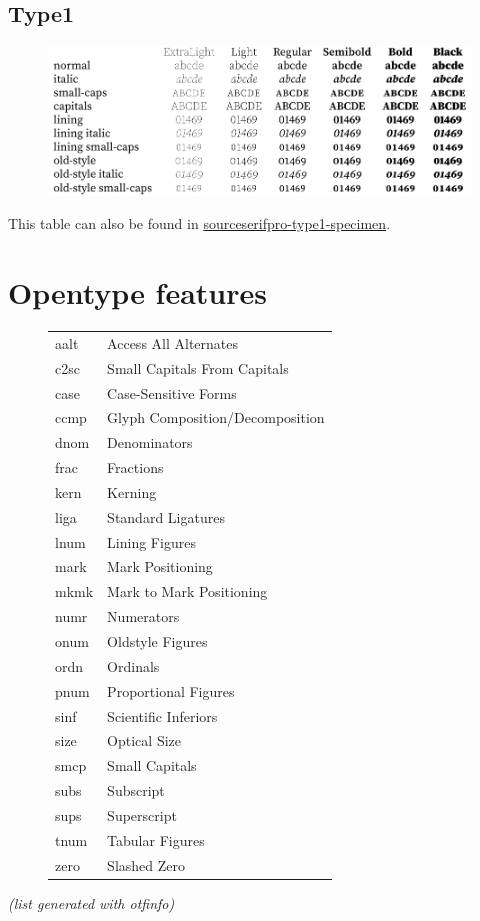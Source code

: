 \documentclass[10pt,a4paper,english]{article}
\newcommand*\file[1]{\href{run:#1.pdf}{#1}}
\begin{document}
\subsection{Type1}
\begin{figure}[ht]
	\centering
	\includegraphics{sourceserifpro-type1-specimen}
\end{figure}
This table can also be found in \file{sourceserifpro-type1-specimen}.

\newpage
\section{Opentype features}
\label{sec:otfinfo}

\begin{figure}[ht]
	\centering
	\begin{tabular}{>{\ttfamily}l l}
		aalt & Access All Alternates \\
		c2sc & Small Capitals From Capitals \\
		case & Case-Sensitive Forms \\
		ccmp & Glyph Composition/Decomposition \\
		dnom & Denominators \\
		frac & Fractions \\
		kern & Kerning \\
		liga & Standard Ligatures \\
		lnum & Lining Figures \\
		mark & Mark Positioning \\
		mkmk & Mark to Mark Positioning \\
		numr & Numerators \\
		onum & Oldstyle Figures \\
		ordn & Ordinals \\
		pnum & Proportional Figures \\
		sinf & Scientific Inferiors \\
		size & Optical Size \\
		smcp & Small Capitals \\
		subs & Subscript \\
		sups & Superscript \\
		tnum & Tabular Figures \\
		zero & Slashed Zero \\
	\end{tabular}
\end{figure}
\textit{(list generated with otfinfo)}
\end{document}
